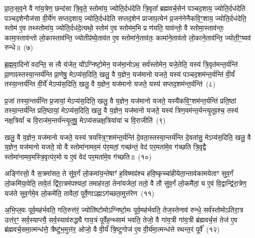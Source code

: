 {\anuvakamend[{अस्थू॑रि॒रोष॑धीषु ज्येष्ठय॒ज्ञ इति॑ बृ॒हद॑नु॒ष्टुप्छन्दः॒ प्रति॑ष्ठिता॒ नव॑ च}]}%

प्रा॒तः॒स॒व॒ने वै गा॑य॒त्रेण॒ छन्द॑सा त्रि॒वृते॒ स्तोमा॑य॒ ज्योति॒र्दध॑देति त्रि॒वृता᳚ ब्रह्मवर्च॒सेन॑ पञ्चद॒शाय॒ ज्योति॒र्दध॑देति पञ्चद॒शेनौज॑सा वी॒र्ये॑ण सप्तद॒शाय॒ ज्योति॒र्दध॑देति सप्तद॒शेन॑ प्राजाप॒त्येन॑ प्र॒जन॑नेनैकवि॒ꣳ॒शाय॒ ज्योति॒र्दध॑देति॒ स्तोम॑ ए॒व तथ्स्तोमा॑य॒ ज्योति॒र्दध॑दे॒त्यथो॒ स्तोम॑ ए॒व स्तोम॑म॒भि प्र ण॑यति॒ याव॑न्तो॒ वै स्तोमा॒स्ताव॑न्तः॒ कामा॒स्ताव॑न्तो लो॒कास्ताव॑न्ति॒ ज्योतीꣴ॑ष्ये॒ताव॑त ए॒व स्तोमा॑ने॒ताव॑तः॒ कामा॑ने॒ताव॑तो लो॒काने॒ताव॑न्ति॒ ज्योती॒ꣳ॒ष्यव॑ रुन्धे॥~(७)

{\anuvakamend[{ताव॑न्तो लो॒कास्त्रयो॑दश च}]}%

ब्र॒ह्म॒वा॒दिनो॑ वदन्ति॒ स त्वै य॑जेत॒ यो᳚\-ऽग्निष्टो॒मेन॒ यज॑मा॒नो\-ऽथ॒ सर्व॑स्तोमेन॒ यजे॒तेति॒ यस्य॑ त्रि॒वृत॑मन्त॒र्यन्ति॑ प्रा॒णाꣴस्तस्या॒न्तर्य॑न्ति प्रा॒णेषु॒ मे\-ऽप्य॑स॒दिति॒ खलु॒ वै य॒ज्ञेन॒ यज॑मानो यजते॒ यस्य॑ पञ्चद॒शम॑न्त॒र्यन्ति॑ वी॒र्यं॑ तस्या॒न्तर्य॑न्ति वी॒र्ये॑ मे\-ऽप्य॑स॒दिति॒ खलु॒ वै य॒ज्ञेन॒ यज॑मानो यजते॒ यस्य॑ सप्तद॒शम॑न्त॒र्यन्ति॑~(८)

प्र॒जां तस्या॒न्तर्य॑न्ति प्र॒जायां॒ मे\-ऽप्य॑स॒दिति॒ खलु॒ वै य॒ज्ञेन॒ यज॑मानो यजते॒ यस्यै॑कवि॒ꣳ॒शम॑न्त॒र्यन्ति॑ प्रति॒ष्ठां तस्या॒न्तर्य॑न्ति प्रति॒ष्ठायां॒ मे\-ऽप्य॑स॒दिति॒ खलु॒ वै य॒ज्ञेन॒ यज॑मानो यजते॒ यस्य॑ त्रिण॒वम॑न्त॒र्यन्त्यृ॒तूꣴश्च॒ तस्य॑ नक्ष॒त्रियां᳚ च वि॒राज॑म॒न्तर्य॑न्त्यृ॒तुषु॒ मे\-ऽप्य॑सन्नक्ष॒त्रिया॑यां च वि॒राजीति॑~(९)

खलु॒ वै य॒ज्ञेन॒ यज॑मानो यजते॒ यस्य॑ त्रयस्त्रि॒ꣳ॒शम॑न्त॒र्यन्ति॑ दे॒वता॒स्तस्या॒न्तर्य॑न्ति दे॒वता॑सु॒ मे\-ऽप्य॑स॒दिति॒ खलु॒ वै य॒ज्ञेन॒ यज॑मानो यजते॒ यो वै स्तोमा॑नामव॒मं प॑र॒मतां॒ गच्छ॑न्तं॒ वेद॑ पर॒मता॑मे॒व ग॑च्छति त्रि॒वृद्वै स्तोमा॑नामव॒म\-स्त्रि॒वृत्प॑र॒मो य ए॒वं वेद॑ पर॒मता॑मे॒व ग॑च्छति॥~(१०)

{\anuvakamend[{स॒प्त॒द॒शम॑न्त॒र्यन्ति॑ वि॒राजीति॒ चतु॑श्चत्वारिꣳशच्च}]}%

अङ्गि॑रसो॒ वै स॒त्रमा॑सत॒ ते सु॑व॒र्गं लो॒कमा॑य॒न्तेषाꣳ॑ ह॒विष्माꣴ॑श्च हवि॒ष्कृच्चा॑हीयेता॒न्ताव॑कामयेताꣳ सुव॒र्गं लो॒कमि॑या॒वेति॒ तावे॒तं द्वि॑रा॒त्रम॑पश्यतां॒ तमाह॑रतां॒ तेना॑यजेतां॒ ततो॒ वै तौ सु॑व॒र्गं लो॒कमै॑तां॒ य ए॒वं वि॒द्वान्द्वि॑रा॒त्रेण॒ यज॑ते सुव॒र्गमे॒व लो॒कमे॑ति॒ तावैतां॒ पूर्वे॒णा\-ऽह्ना\-ऽग॑च्छता॒मुत्त॑रेण~(११)

अ॒भि॒प्ल॒वः पूर्व॒मह॑र्भवति॒ गति॒रुत्त॑रं॒ ज्योति॑ष्टोमो\-ऽग्निष्टो॒मः पूर्व॒मह॑र्भवति॒ तेज॒स्तेनाव॑ रुन्धे॒ सर्व॑स्तोमो\-ऽतिरा॒त्र उत्त॑र॒ꣳ॒ सर्व॒स्याप्त्यै॒ सर्व॒स्याव॑रुद्ध्यै गाय॒त्रं पूर्वेह॒न्थ्साम॑ भवति॒ तेजो॒ वै गा॑य॒त्री गा॑य॒त्री ब्र॑ह्मवर्च॒सं तेज॑ ए॒व ब्र॑ह्मवर्च॒स\-मा॒त्मन्ध॑त्ते॒ त्रैष्टु॑भ॒मुत्त॑र॒ ओजो॒ वै वी॒र्यं॑ त्रि॒ष्टुगोज॑ ए॒व वी॒र्य॑मा॒त्मन्ध॑त्ते रथन्त॒रं पूर्वे᳚~(१२)


